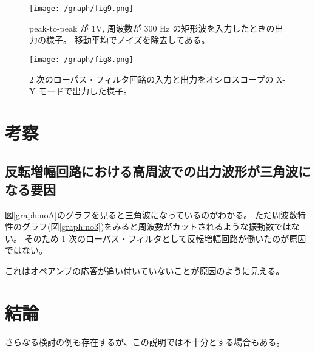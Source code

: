 \documentclass[11pt,dvipdfmx,a4paper]{jsarticle}
\begin{document}
\begin{figure}[H]
	\centering
	\begin{minipage}[t]{0.55\columnwidth}
		\centering
		\texttt{[image: /graph/fig9.png]}
		\caption{peak-to-peak が 1V, 周波数が 300 Hz の矩形波を入力したときの出力の様子。
		移動平均でノイズを除去してある。}
		\label{graph:no9}
	\end{minipage}
	\hfill
	\begin{minipage}[t]{0.42\columnwidth}
		\centering
		\texttt{[image: /graph/fig8.png]}
		\caption{2 次のローパス・フィルタ回路の入力と出力をオシロスコープの X-Y モードで出力した様子。}
		\label{graph:no8}
	\end{minipage}
\end{figure}

\section{考察}
\subsection{反転増幅回路における高周波での出力波形が三角波になる要因}
図\ref{graph:noA}のグラフを見ると三角波になっているのがわかる。
ただ周波数特性のグラフ(図\ref{graph:no3})をみると周波数がカットされるような振動数ではない。
そのため 1 次のローパス・フィルタとして反転増幅回路が働いたのが原因ではない。

これはオペアンプの応答が追い付いていないことが原因のように見える。

\section{結論}


さらなる検討の例\cite{huga}も存在するが、この説明では不十分とする場合もある\cite{hoge}。



\end{document}
